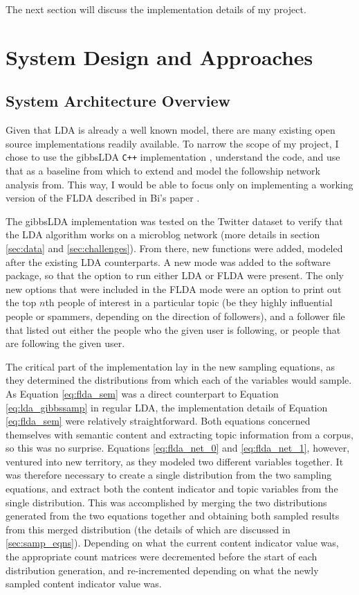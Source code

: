 \documentclass[a4paper]{article}
\begin{document}
The next section will discuss the implementation details of my project.

\section{System Design and Approaches}
\label{sec:approach}
\subsection{System Architecture Overview}
Given that LDA is already a well known model, there are many existing open source implementations readily available. To narrow the scope of my project, I chose to use the gibbsLDA \verb!C++! implementation \cite{gibbs_lda}, understand the code, and use that as a baseline from which to extend and model the followship network analysis from. This way, I would be able to focus only on implementing a working version of the FLDA described in Bi's paper \cite{flda}.

The gibbsLDA implementation was tested on the Twitter dataset to verify that the LDA algorithm works on a microblog network (more details in section \ref{sec:data} and \ref{sec:challenges}). From there, new functions were added, modeled after the existing LDA counterparts. A new mode was added to the software package, so that the option to run either LDA or FLDA were present. The only new options that were included in the FLDA mode were an option to print out the top $n$th people of interest in a particular topic (be they highly influential people or spammers, depending on the direction of followers), and a follower file that listed out either the people who the given user is following, or people that are following the given user.

The critical part of the implementation lay in the new sampling equations, as they determined the distributions from which each of the variables would sample. As Equation \ref{eq:flda_sem} was a direct counterpart to Equation \ref{eq:lda_gibbssamp} in regular LDA, the implementation details of Equation \ref{eq:flda_sem} were relatively straightforward. Both equations concerned themselves with semantic content and extracting topic information from a corpus, so this was no surprise. Equations \ref{eq:flda_net_0} and \ref{eq:flda_net_1}, however, ventured into new territory, as they modeled two different variables together. It was therefore necessary to create a single distribution from the two sampling equations, and extract both the content indicator and topic variables from the single distribution. This was accomplished by merging the two distributions generated from the two equations together and obtaining both sampled results from this merged distribution (the details of which are discussed in \ref{sec:samp_eqns}). Depending on what the current content indicator value was, the appropriate count matrices were decremented before the start of each distribution generation, and re-incremented depending on what the newly sampled content indicator value was.
\end{document}
